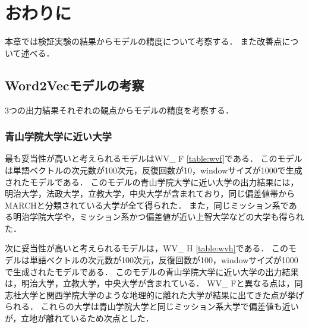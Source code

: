 \chapter{おわりに}
本章では検証実験の結果からモデルの精度について考察する．
また改善点について述べる．




\section{Word2Vecモデルの考察}
3つの出力結果それぞれの観点からモデルの精度を考察する．

\subsection{青山学院大学に近い大学}
最も妥当性が高いと考えられるモデルはWV\_ F \ref{table:wvf}である．
このモデルは単語ベクトルの次元数が100次元，反復回数が10，windowサイズが1000で生成されたモデルである．
このモデルの青山学院大学に近い大学の出力結果には，明治大学，法政大学，立教大学，中央大学が含まれており，同じ偏差値帯からMARCHと分類されている大学が全て得られた．
また，同じミッション系である明治学院大学や，ミッション系かつ偏差値が近い上智大学などの大学も得られた．

次に妥当性が高いと考えられるモデルは，WV\_ H \ref{table:wvh}である．
このモデルは単語ベクトルの次元数が100次元，反復回数が100，windowサイズが1000で生成されたモデルである．
このモデルの青山学院大学に近い大学の出力結果は，明治大学，立教大学，中央大学が含まれている．
WV\_ Fと異なる点は，同志社大学と関西学院大学のような地理的に離れた大学が結果に出てきた点が挙げられる．
これらの大学は青山学院大学と同じミッション系大学で偏差値も近いが，立地が離れているため次点とした．

